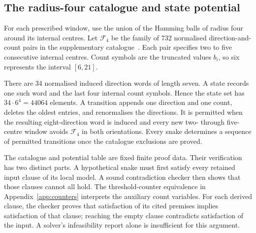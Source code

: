 \documentclass[11pt,a4paper]{article}
\theoremstyle{definition}
\theoremstyle{remark}
\begin{document}
\subsection{The radius-four catalogue and state potential}\label{sec:radius-four-236}
For each prescribed window, use the union of the Hamming balls of radius four around its internal centres. Let $\mathcal F_4$ be the family of 732 normalised direction-and-count pairs in the supplementary catalogue~\cite{radiusfourarchive}. Each pair specifies two to five consecutive internal centres. Count symbols are the truncated values $b_i$, so six represents the interval $[6,21]$.

There are 34 normalised induced direction words of length seven. A state records one such word and the last four internal count symbols. Hence the state set has $34\cdot6^4=44064$ elements. A transition appends one direction and one count, deletes the oldest entries, and renormalises the directions. It is permitted when the resulting eight-direction word is induced and every new two- through five-centre window avoids $\mathcal F_4$ in both orientations. Every snake determines a sequence of permitted transitions once the catalogue exclusions are proved.

The catalogue and potential table are fixed finite proof data. Their verification has two distinct parts. A hypothetical snake must first satisfy every retained input clause of its local model. A sound contradiction checker then shows that those clauses cannot all hold. The threshold-counter equivalence in Appendix~\ref{app:counters} interprets the auxiliary count variables. For each derived clause, the checker proves that satisfaction of its cited premises implies satisfaction of that clause; reaching the empty clause contradicts satisfaction of the input. A solver's infeasibility report alone is insufficient for this argument.
\end{document}
